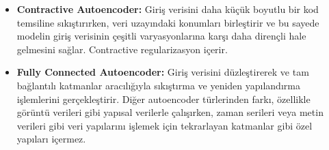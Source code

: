 \begin{itemize}
    \item \textbf{Contractive Autoencoder:} Giriş verisini daha küçük boyutlu bir kod temsiline sıkıştırırken, veri uzayındaki konumları birleştirir ve bu sayede modelin giriş verisinin çeşitli varyasyonlarına karşı daha dirençli hale gelmesini sağlar. Contractive regularizasyon içerir.
    \item \textbf{Fully Connected Autoencoder:} Giriş verisini düzleştirerek ve tam bağlantılı katmanlar aracılığıyla sıkıştırma ve yeniden yapılandırma işlemlerini gerçekleştirir. Diğer autoencoder türlerinden farkı, özellikle görüntü verileri gibi yapısal verilerle çalışırken, zaman serileri veya metin verileri gibi veri yapılarını işlemek için tekrarlayan katmanlar gibi özel yapıları içermez.
\end{itemize}

\newpage